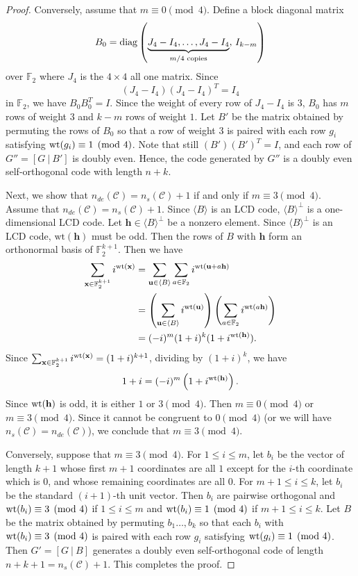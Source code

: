 \documentclass{article}
\theoremstyle{definition}
\theoremstyle{remark}
\begin{document}
\begin{proof}
    Conversely, assume that $m\equiv0\pmod 4$. Define a block diagonal matrix
    \[
    B_0={\rm{diag}}\left(\underbrace{J_4-I_4,\dots,J_4-I_4}_{m/4\text{ copies}},\, I_{k-m}\right)
    \]
    over $\mathbb{F}_2$ where $J_4$ is the $4\times 4$ all one matrix. Since
    \[
    (J_4-I_4)(J_4-I_4)^T=I_4
    \]
    in $\mathbb{F}_2$, we have $B_0B_0^T=I$. Since the weight of every row of $J_4-I_4$ is $3$, $B_0$ has $m$ rows of weight $3$ and $k-m$ rows of weight $1$. Let $B'$ be the matrix obtained by permuting the rows of $B_0$ so that a row of weight $3$ is paired with each row $g_i$ satisfying ${\rm wt}(g_i)\equiv 1\pmod 4$. Note that still $(B')(B')^T=I$, and each row of $G''=[G~|~B']$ is doubly even. Hence, the code generated by $G''$ is a doubly even self-orthogonal code with length $n+k$.

    Next, we show that $n_{de}(\mathcal{C})=n_s(\mathcal{C})+1$ if and only if $m\equiv 3\pmod 4$. Assume that $n_{de}(\mathcal{C})=n_s(\mathcal{C})+1$. Since $\langle B\rangle$ is an LCD code, $\langle B\rangle^\perp$ is a one-dimensional LCD code. Let $\mathbf{h}\in\langle B\rangle^\perp$ be a nonzero element. Since $\langle B\rangle^\perp$ is an LCD code, $\mathrm{wt}(\mathbf{h})$ must be odd. Then the rows of $B$ with $\mathbf{h}$ form an orthonormal basis of $\mathbb{F}_2^{k+1}$. Then we have
    \begin{align*}
    \sum_{\mathbf{x}\in\mathbb{F}_2^{k+1}}i^{{\rm wt}(\mathbf{x})}&=\sum_{\mathbf{u}\in\langle B\rangle}\sum_{a\in \mathbb{F}_2}i^{{\rm wt}(\mathbf{u}+a\mathbf{h})}\\&=\left(\sum_{\mathbf{u}\in\langle B\rangle}i^{{\rm wt}(\mathbf{u})}\right)\left(\sum_{a\in \mathbb{F}_2}i^{{\rm wt}(a\mathbf{h})}\right)\\&=(-i)^m(1+i)^k(1+i^{{\rm wt}(\mathbf{h})}).
    \end{align*}
    Since $\sum_{\mathbf{x}\in\mathbb F_2^{k+1}} i^{{\rm{wt}}(\mathbf{x})}=(1+i)^{k+1}$, dividing by $(1+i)^k$, we have
    \[
    1+i=(-i)^m\left(1+i^{{\rm wt}(\mathbf{h})}\right).
    \]
    Since ${\rm wt}(\mathbf{h})$ is odd, it is either $1$ or $3\pmod 4$. Then $m\equiv 0\pmod 4$ or $m\equiv 3\pmod 4$. Since it cannot be congruent to $0\pmod 4$ (or we will have $n_s(\mathcal{C})=n_{de}(\mathcal{C})$), we conclude that $m\equiv 3\pmod 4$.

    Conversely, suppose that $m\equiv 3\pmod 4$. For $1\le i\le m$, let $b_i$ be the vector of length $k+1$ whose first $m+1$ coordinates are all $1$ except for the $i$-th coordinate which is $0$, and whose remaining coordinates are all $0$. For $m+1\le i\le k$, let $b_i$ be the standard $(i+1)$-th unit vector. Then $b_i$ are pairwise orthogonal and ${\rm wt}(b_i)\equiv 3\pmod 4$ if $1\le i\le m$ and ${\rm wt}(b_i)\equiv 1\pmod 4$ if $m+1\le i\le k$. Let $B$ be the matrix obtained by permuting $b_1\ldots, b_k$ so that each $b_i$ with ${\rm wt}(b_i)\equiv 3\pmod 4$ is paired with each row $g_i$ satisfying ${\rm wt}(g_i)\equiv 1\pmod 4$. Then $G'=[G~|~B]$ generates a doubly even self-orthogonal code of length $n+k+1=n_s(\mathcal{C})+1$. This completes the proof.
\end{proof}
\end{document}
